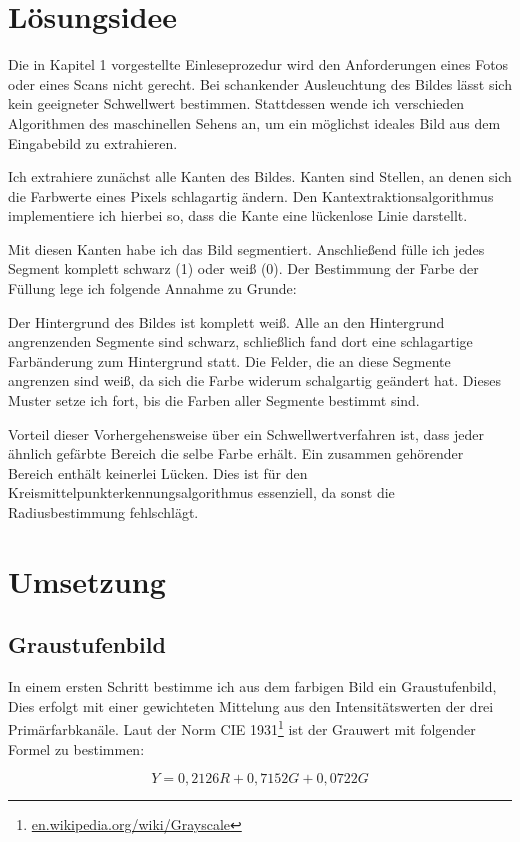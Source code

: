 \section{Lösungsidee}
Die in Kapitel 1 vorgestellte Einleseprozedur wird den Anforderungen eines Fotos oder eines Scans nicht gerecht. Bei schankender Ausleuchtung des Bildes lässt sich kein geeigneter Schwellwert bestimmen. Stattdessen wende ich verschieden Algorithmen des maschinellen Sehens an, um ein möglichst ideales Bild aus dem Eingabebild zu extrahieren.

Ich extrahiere zunächst alle Kanten des Bildes. Kanten sind Stellen, an denen sich die Farbwerte eines Pixels schlagartig ändern. Den Kantextraktionsalgorithmus implementiere ich hierbei so, dass die Kante eine lückenlose Linie darstellt.

Mit diesen Kanten habe ich das Bild segmentiert. Anschließend fülle ich jedes Segment komplett schwarz (1) oder weiß (0).
Der Bestimmung der Farbe der Füllung lege ich folgende Annahme zu Grunde:

Der Hintergrund des Bildes ist komplett weiß. Alle an den Hintergrund angrenzenden Segmente sind schwarz, schließlich fand dort eine schlagartige Farbänderung zum Hintergrund statt. Die Felder, die an diese Segmente angrenzen sind weiß, da sich die Farbe widerum schalgartig geändert hat. Dieses Muster setze ich fort, bis die Farben aller Segmente bestimmt sind.

Vorteil dieser Vorhergehensweise über ein Schwellwertverfahren ist, dass jeder ähnlich gefärbte Bereich die selbe Farbe erhält. Ein zusammen gehörender Bereich enthält keinerlei Lücken. Dies ist für den Kreismittelpunkterkennungsalgorithmus essenziell, da sonst die Radiusbestimmung fehlschlägt.
 
\section{Umsetzung}
\subsection{Graustufenbild}
In einem ersten Schritt bestimme ich aus dem farbigen Bild ein Graustufenbild, Dies erfolgt mit einer gewichteten Mittelung aus den Intensitätswerten der drei Primärfarbkanäle. Laut der Norm CIE 1931\footnote{\url{en.wikipedia.org/wiki/Grayscale}} ist der Grauwert mit folgender Formel zu bestimmen:

\begin{equation}
Y = 0,2126R+0,7152G+0,0722G
\end{equation}

